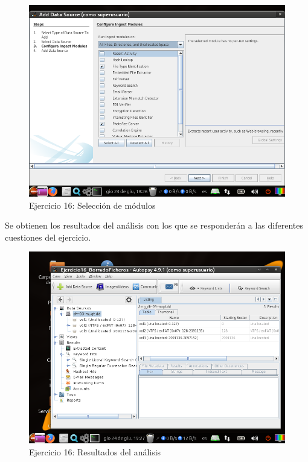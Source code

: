 \documentclass[11pt]{article}
\begin{document}
\begin{figure}[H]
    \caption{Ejercicio 16: Selección de módulos}
    \centering
    \includegraphics[scale=0.7]{e16-4.png}
\end{figure}

Se obtienen los resultados del análisis con los que se responderán a las diferentes cuestiones del ejercicio.

\begin{figure}[H]
    \caption{Ejercicio 16: Resultados del análisis}
    \centering
    \includegraphics[scale=0.7]{e16-5.png}
\end{figure}
\end{document}
